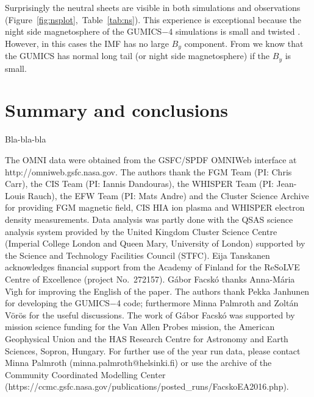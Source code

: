 \documentclass[linenumbers,draft]{agujournal}
\begin{document}
Surprisingly the neutral sheets are visible in both simulations and observations (Figure~\ref{fig:nsplot},~Table~\ref{tab:ns}). This experience is exceptional because the night side magnetosphere of the GUMICS$-$4 simulations is small and twisted \citep{gordeev13:_verif_gumic_mhd,facsko16:_one_earth}. However, in this cases the IMF has no large $B_{y}$ component. From \citet{facsko16:_one_earth} we know that the GUMICS has normal long tail (or night side magnetosphere) if the $B_{y}$ is small.

\section{Summary and conclusions}
\label{sec:concl}

Bla-bla-bla

\begin{acknowledgments}
The OMNI data were obtained from the GSFC/SPDF OMNIWeb interface at http://omniweb.gsfc.nasa.gov. The authors thank the FGM Team (PI: Chris Carr), the CIS Team (PI: Iannis Dandouras), the WHISPER Team (PI: Jean-Louis Rauch), the EFW Team (PI: Mats Andre) and the Cluster Science Archive for providing FGM magnetic field, CIS HIA ion plasma and WHISPER electron density measurements. Data analysis was partly done with the QSAS science analysis system provided by the United Kingdom Cluster Science Centre (Imperial College London and Queen Mary, University of London) supported by the Science and Technology Facilities Council (STFC). Eija Tanskanen acknowledges financial support from the Academy of Finland for the ReSoLVE Centre of Excellence (project No.~272157). G{\'a}bor Facsk{\'o} thanks Anna-M\'aria V\'\i gh for improving the English of the paper. The authors thank Pekka Janhunen for developing the GUMICS$-$4 code; furthermore Minna Palmroth and Zolt{\'a}n V{\"o}r{\"o}s for the useful discussions. The work of G{\'a}bor Facsk{\'o} was supported by mission science funding for the Van Allen Probes mission, the American Geophysical Union and the HAS Research Centre for Astronomy and Earth Sciences, Sopron, Hungary. For further use of the year run data, please contact Minna Palmroth (minna.palmroth@helsinki.fi) or use the archive of the Community Coordinated Modelling Center (https://ccmc.gsfc.nasa.gov/publications/posted\_runs/FacskoEA2016.php).
\end{acknowledgments}





\end{document}

